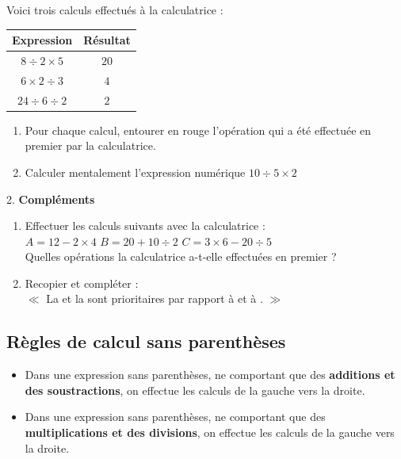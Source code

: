 \begin{activitybox}
Voici trois calculs effectués à la calculatrice :

\begin{center}
\begin{tabular}{|c|c|}
\hline
\textbf{Expression} & \textbf{Résultat} \\
\hline
$8 \div 2 \times 5$ & $20$ \\
\hline
$6 \times 2 \div 3$ & $4$ \\
\hline
$24 \div 6 \div 2$ & $2$ \\
\hline
\end{tabular}
\end{center}

\begin{enumerate}[label=\alph*)]
\item Pour chaque calcul, entourer en rouge l'opération qui a été effectuée en premier par la calculatrice.
\item Calculer mentalement l'expression numérique $10 \div 5 \times 2$
\end{enumerate}

\medskip

2. \textbf{Compléments}

\begin{enumerate}[label=\alph*)]
\item Effectuer les calculs suivants avec la calculatrice :\\
\quad $A = 12 - 2 \times 4$ \qquad $B = 20 + 10 \div 2$ \qquad $C = 3 \times 6 - 20 \div 5$\\
Quelles opérations la calculatrice a-t-elle effectuées en premier ?
\item Recopier et compléter :\\
$\ll$ La \trous{6cm} et la \trous{6cm} sont prioritaires par rapport à \trous{8cm} et à \trous{6cm}. $\gg$
\end{enumerate}
\end{activitybox}

\subsection{Règles de calcul sans parenthèses}
\raggedbottom
\begin{proprietebox}
\begin{itemize}[label = \textbullet]
\item Dans une expression sans parenthèses, ne comportant que des \textbf{additions et des soustractions}, on effectue les calculs de la gauche vers la droite.
\item Dans une expression sans parenthèses, ne comportant que des \textbf{multiplications et des divisions}, on effectue les calculs de la gauche vers la droite.
\end{itemize}
\end{proprietebox}

